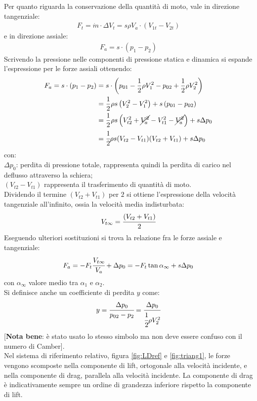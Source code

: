 Per quanto riguarda la conservazione della quantità di moto, vale in direzione tangenziale:
\begin{align*}
F_t= \dot{m} \cdot \Delta V_t = s \rho	V_a \cdot (V_{1t}-V_{2t})
\end{align*}
e in direzione assiale:
\begin{align*}
F_a = s \cdot (p_1 - p_2)
\end{align*}
Scrivendo la pressione nelle componenti di pressione statica e dinamica si espande l'espressione per le forze assiali ottenendo:
\begin{align*}
F_a = s \cdot ( p_1 - p_2) &= s \cdot \left( p_{01} - \frac{1}{2} \rho V_1^2 - p_{02} + \frac{1}{2} \rho V_2^2 \right)\\
&= \frac{1}{2} \rho s \left( V_2^2 - V_1^2 \right) + s \left( p_{01} - p_{02} \right)\\
&= \frac{1}{2} \rho s \left( V_{t2}^2 + \cancel{V_a^2} - V_{t1}^2- \cancel{V_a^2} \right) + s \Delta p_0\\
&=\cfrac{1}{2} \rho s (V_{t2}-V_{t1}) (V_{t2}+V_{t1}) + s \Delta p_0
\end{align*}
con:\\[1mm]
$\Delta p_0$: perdita di pressione totale, rappresenta quindi la perdita di carico nel deflusso attraverso la schiera; \\
$(V_{t2}-V_{t1})$ rappresenta il trasferimento di quantità di moto. \\[2mm]
Dividendo il termine $(V_{t2}+V_{t1})$ per $2$ si ottiene l'espressione della velocità tangenziale all'infinito, ossia la velocità media indisturbata:
\begin{align*}
V_{t \infty}=\cfrac{(V_{t2}+V_{t1})}{2}
\end{align*}
Eseguendo ulteriori sostituzioni si trova la relazione fra le forze assiale e tangenziale:
\begin{align*}
F_a = -F_t \cfrac{V_{t \infty}}{V_a} + \Delta p_0 = - F_t \tan \alpha_{\infty} + s \Delta p_0
\end{align*}
con $\alpha_{\infty}$ valore medio tra $\alpha_1$ e $\alpha_2$.\\
Si definisce anche un coefficiente di perdita $y$ come:
\begin{align*}
y = \cfrac{\Delta p_0}{p_{02}-p_2} = \cfrac{\Delta p_0}{\cfrac{1}{2} \rho V_2^2}
\end{align*}
[\textbf{Nota bene}: è stato usato lo stesso simbolo ma non deve essere confuso con il numero di Camber].\\
Nel sistema di riferimento relativo, figura \ref{fig:LDref} e \ref{fig:triang1}, le forze vengono scomposte nella componente di lift, ortogonale alla velocità incidente, e nella componente di drag, parallela alla velocità incidente. La componente di drag è indicativamente sempre un ordine di grandezza inferiore rispetto la componente di lift.
